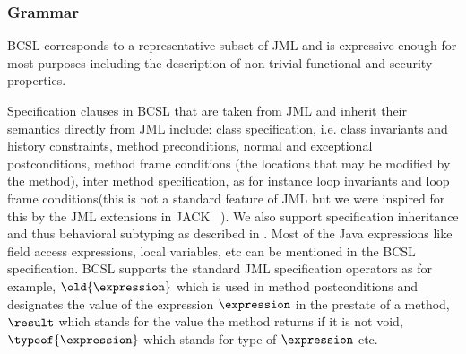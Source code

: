 \subsubsection{Grammar} \label{grammar}


BCSL corresponds to a representative subset of JML and is expressive enough for most purposes including the description of non trivial functional and security properties.

 Specification clauses in BCSL that are taken from JML and inherit their semantics directly from JML include:
class specification, i.e. class invariants and history constraints,   %
  method preconditions, normal and exceptional postconditions, method frame conditions (the locations that may be modified by the method), inter method specification, as for instance loop invariants and loop frame conditions(this is not a standard feature of JML but we were inspired for this by the JML extensions in JACK ~\cite{BRL-JACK}). 
We also support specification inheritance and thus behavioral subtyping as described in \cite{Dhara-Leavens96}. Most of the Java expressions like field access expressions, local variables, etc can be mentioned in the BCSL specification.
BCSL supports the standard JML specification operators as for example, $\old{\expression}$ which is used in method postconditions and
 designates the value of the expression $\expression$ in the prestate of a method, $ \result$ which stands for the value the method
returns if it is not void,  $\typeof{\expression}$ which stands for type of $\expression$ etc.  





